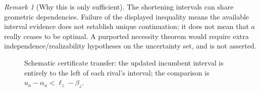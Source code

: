 \documentclass[11pt]{article}
\theoremstyle{definition}\newtheorem{definition}[theorem]{Definition}\newtheorem{assumption}[theorem]{Assumption}
\theoremstyle{remark}\newtheorem{remark}[theorem]{Remark}
\begin{document}
\begin{remark}[Why this is only sufficient]
The shortening intervals can share geometric dependencies. Failure of the displayed inequality means the available interval evidence does not establish unique continuation; it does not mean that $a$ really ceases to be optimal. A purported necessity theorem would require extra independence/realizability hypotheses on the uncertainty set, and is not asserted.
\end{remark}

\begin{figure}[htbp]\centering
{}
\caption{Schematic certificate transfer: the updated incumbent interval is entirely to the left of each rival's interval; the comparison is $u_a-\alpha_a<\ell_z-\beta_z$.}\label{fig:interval}
\end{figure}
\end{document}
